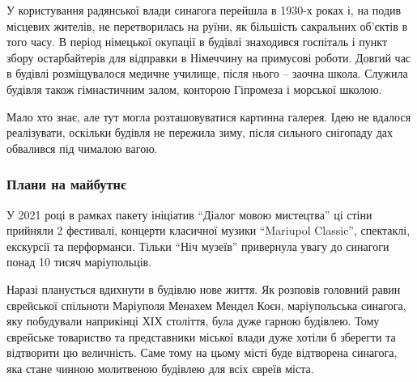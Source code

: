 У користування радянської влади синагога перейшла в 1930-х роках і, на подив
місцевих жителів, не перетворилась на руїни, як більшість сакральних об'єктів в
того часу. В період німецької окупації в будівлі знаходився госпіталь і пункт
збору остарбайтерів для відправки в Німеччину на примусові роботи. Довгий час в
будівлі розміщувалося медичне училище, після нього – заочна школа. Служила
будівля також гімнастичним залом, конторою Гіпромеза і морської школою.

Мало хто знає, але тут могла розташовуватися картинна галерея. Ідею не вдалося
реалізувати, оскільки будівля не пережила зиму, після сильного снігопаду дах
обвалився під чималою вагою.

\subsubsection{Плани на майбутнє}

У 2021 році в рамках пакету ініціатив \enquote{Діалог мовою мистецтва} ці стіни
прийняли 2 фестивалі, концерти класичної музики \enquote{Mariupol Classic}, спектаклі,
екскурсії та перформанси. Тільки \enquote{Ніч музеїв} привернула увагу до синагоги
понад 10 тисяч маріупольців.

Наразі планується вдихнути в будівлю нове життя. Як розповів головний равин
єврейської спільноти Маріуполя Менахем Мендел Коєн, маріупольська синагога, яку
побудували наприкінці ХІХ століття, була дуже гарною будівлею. Тому єврейське
товариство та представники міської влади дуже хотіли б зберегти та відтворити
цю величність. Саме тому на цьому місті буде відтворена синагога, яка стане
чинною молитвеною будівлею для всіх євреїв міста.

